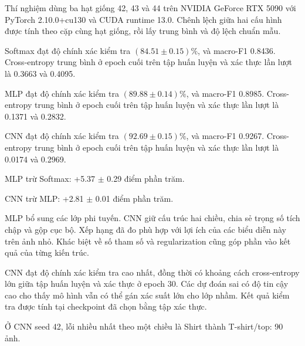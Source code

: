 Thí nghiệm dùng ba hạt giống 42, 43 và 44 trên NVIDIA GeForce RTX 5090 với PyTorch 2.10.0+cu130 và CUDA runtime 13.0. Chênh lệch giữa hai cấu hình được tính theo cặp cùng hạt giống, rồi lấy trung bình và độ lệch chuẩn mẫu.

Softmax đạt độ chính xác kiểm tra $(84.51 \pm 0.15)\%$, và macro-F1 0.8436. Cross-entropy trung bình ở epoch cuối trên tập huấn luyện và xác thực lần lượt là 0.3663 và 0.4095.

MLP đạt độ chính xác kiểm tra $(89.88 \pm 0.14)\%$, và macro-F1 0.8985. Cross-entropy trung bình ở epoch cuối trên tập huấn luyện và xác thực lần lượt là 0.1371 và 0.2832.

CNN đạt độ chính xác kiểm tra $(92.69 \pm 0.15)\%$, và macro-F1 0.9267. Cross-entropy trung bình ở epoch cuối trên tập huấn luyện và xác thực lần lượt là 0.0174 và 0.2969.

MLP trừ Softmax: +5.37 $\pm$ 0.29 điểm phần trăm.

CNN trừ MLP: +2.81 $\pm$ 0.01 điểm phần trăm.

MLP bổ sung các lớp phi tuyến. CNN giữ cấu trúc hai chiều, chia sẻ trọng số tích chập và gộp cục bộ. Xếp hạng đã đo phù hợp với lợi ích của các biểu diễn này trên ảnh nhỏ. Khác biệt về số tham số và regularization cũng góp phần vào kết quả của từng kiến trúc.

CNN đạt độ chính xác kiểm tra cao nhất, đồng thời có khoảng cách cross-entropy lớn giữa tập huấn luyện và xác thực ở epoch 30. Các dự đoán sai có độ tin cậy cao cho thấy mô hình vẫn có thể gán xác suất lớn cho lớp nhầm. Kết quả kiểm tra được tính tại checkpoint đã chọn bằng tập xác thực.

Ở CNN seed 42, lỗi nhiều nhất theo một chiều là Shirt thành T-shirt/top: 90 ảnh.
